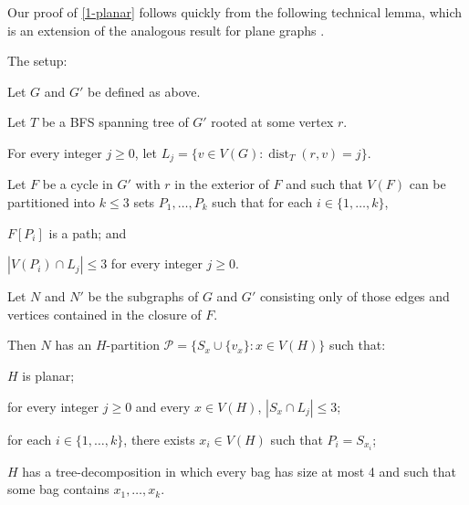 \documentclass{patmorin}
\DeclareMathOperator{\dist}{dist}
\newcommand{\PP}{\mathcal{P}}
\renewcommand{\ge}{\geqslant}
\renewcommand{\le}{\leqslant}
\begin{document}
Our proof of \cref{1-planar} follows quickly from the following technical lemma, which is an extension of the analogous result for plane graphs \cite{DJMMUW20}.
\begin{lem}
	\label{induction} The setup:
	\begin{compactenum}
		\item Let $G$ and $G'$ be defined as above.
		\item Let $T$ be a BFS spanning tree of $G'$ rooted at some vertex $r$.
		\item For every integer $j\ge 0$, let $L_j=\{v\in V(G):\dist_T(r,v)=j\}$.
		\item Let $F$ be a cycle in $G'$ with $r$ in the exterior of $F$ and such that $V(F)$ can be partitioned into $k\le 3$ sets $P_1,\ldots,P_k$ such that for each $i\in\{1,\ldots,k\}$,
		\begin{compactenum}
			\item $F[P_i]$ is a path; and
			\item $|V(P_i)\cap L_j| \le 3$ for every integer $j\ge 0$.
		\end{compactenum}
		\item Let $N$ and $N'$ be the subgraphs of $G$ and $G'$ consisting only of those edges and vertices contained in the closure of $F$.
	\end{compactenum}
	Then $N$ has an $H$-partition $\PP=\{S_x\cup\{v_x\} : x\in V(H)\}$ such that:
	\begin{compactenum}[(i)]
		\item $H$ is planar;
		\item for every integer $j\ge 0$ and every $x\in V(H)$, $|S_x\cap L_j|\le 3$;
		\item for each $i\in\{1,\ldots,k\}$, there exists $x_i\in V(H)$ such that $P_i=S_{x_i}$;
		\item $H$ has a tree-decomposition in which every bag has size at most 4 and such that some bag contains $x_1,\ldots,x_k$.
	\end{compactenum}
\end{lem}
\end{document}
